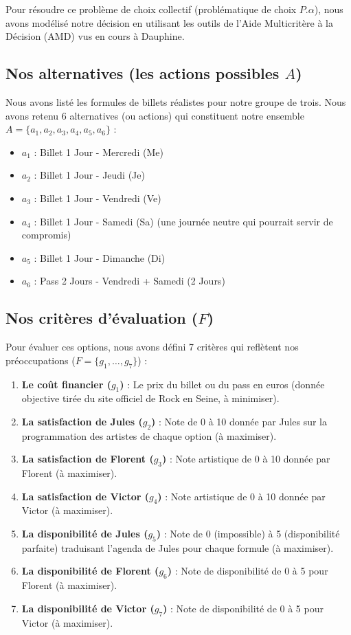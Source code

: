 \documentclass[11pt,a4paper]{article}
\begin{document}
Pour résoudre ce problème de choix collectif (problématique de choix $P.\alpha$), nous avons modélisé notre décision en utilisant les outils de l'Aide Multicritère à la Décision (AMD) vus en cours à Dauphine.

\subsection{Nos alternatives (les actions possibles $A$)}
Nous avons listé les formules de billets réalistes pour notre groupe de trois. Nous avons retenu 6 alternatives (ou actions) qui constituent notre ensemble $A = \{a_1, a_2, a_3, a_4, a_5, a_6\}$ :
\begin{itemize}
    \item $a_1$ : Billet 1 Jour - Mercredi (Me)
    \item $a_2$ : Billet 1 Jour - Jeudi (Je)
    \item $a_3$ : Billet 1 Jour - Vendredi (Ve)
    \item $a_4$ : Billet 1 Jour - Samedi (Sa) (une journée neutre qui pourrait servir de compromis)
    \item $a_5$ : Billet 1 Jour - Dimanche (Di)
    \item $a_6$ : Pass 2 Jours - Vendredi + Samedi (2 Jours)
\end{itemize}

\subsection{Nos critères d'évaluation ($F$)}
Pour évaluer ces options, nous avons défini 7 critères qui reflètent nos préoccupations ($F = \{g_1, \dots, g_7\}$) :
\begin{enumerate}
    \item \textbf{Le coût financier ($g_1$)} : Le prix du billet ou du pass en euros (donnée objective tirée du site officiel de Rock en Seine, à minimiser).
    \item \textbf{La satisfaction de Jules ($g_2$)} : Note de 0 à 10 donnée par Jules sur la programmation des artistes de chaque option (à maximiser).
    \item \textbf{La satisfaction de Florent ($g_3$)} : Note artistique de 0 à 10 donnée par Florent (à maximiser).
    \item \textbf{La satisfaction de Victor ($g_4$)} : Note artistique de 0 à 10 donnée par Victor (à maximiser).
    \item \textbf{La disponibilité de Jules ($g_5$)} : Note de 0 (impossible) à 5 (disponibilité parfaite) traduisant l'agenda de Jules pour chaque formule (à maximiser).
    \item \textbf{La disponibilité de Florent ($g_6$)} : Note de disponibilité de 0 à 5 pour Florent (à maximiser).
    \item \textbf{La disponibilité de Victor ($g_7$)} : Note de disponibilité de 0 à 5 pour Victor (à maximiser).
\end{enumerate}
\end{document}
